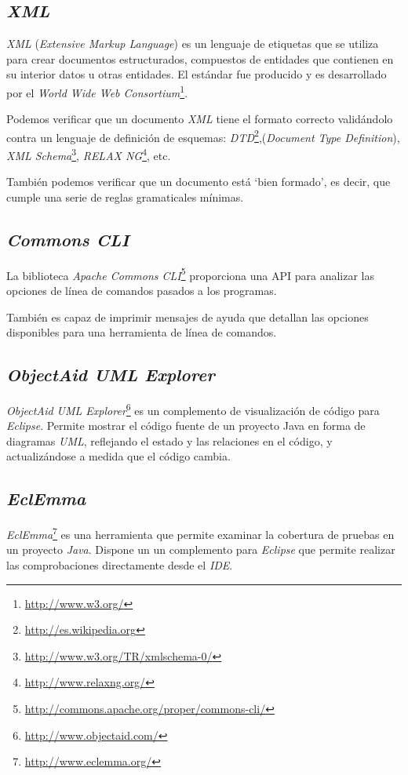 \subsection{\textit{XML}}
\emph{XML} (\emph{Extensive Markup Language}) es un lenguaje de etiquetas que se utiliza para crear documentos estructurados, compuestos de entidades que contienen en su interior datos u otras entidades.
El estándar fue producido y es desarrollado por el \emph{World Wide Web Consortium}\footnote{\url{http://www.w3.org/}}.

Podemos verificar que un documento \emph{XML} tiene el formato correcto validándolo contra un lenguaje de definición de esquemas: \textit{DTD}\footnote{\url{http://es.wikipedia.org}},(\emph{Document Type Definition}), \emph{XML Schema}\footnote{\url{http://www.w3.org/TR/xmlschema-0/}}, \textit{RELAX NG}\footnote{\url{http://www.relaxng.org/}}, etc.

También podemos verificar que un documento está `bien formado', es decir, que cumple una serie de reglas gramaticales mínimas.

\subsection{\textit{Commons CLI}}
La biblioteca \textit{Apache Commons CLI}\footnote{\url{http://commons.apache.org/proper/commons-cli/}} proporciona una API para analizar las opciones de línea de comandos pasados a los programas.

También es capaz de imprimir mensajes de ayuda que detallan las opciones disponibles para una herramienta de línea de comandos.

\subsection{\textit{ObjectAid UML Explorer}}
\textit{ObjectAid UML Explorer}\footnote{\url{http://www.objectaid.com/}} es un complemento de visualización de código para \textit{Eclipse}.
Permite mostrar el código fuente de un proyecto Java en forma de diagramas \textit{UML}, reflejando el estado y las relaciones en el código, y actualizándose a medida que el código cambia.


\subsection{\textit{EclEmma}}
\textit{EclEmma}\footnote{\url{http://www.eclemma.org/}} es una herramienta que permite examinar la cobertura de pruebas en un proyecto \textit{Java}.
Dispone un un complemento para \textit{Eclipse} que permite realizar las comprobaciones directamente desde el \textit{IDE}.

